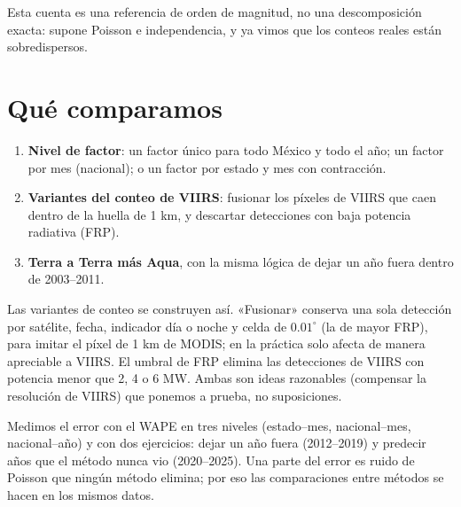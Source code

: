 Esta cuenta es una referencia de orden de magnitud, no una descomposición exacta: supone Poisson e independencia, y ya vimos que los conteos reales están sobredispersos.

\section{Qué comparamos}

\begin{enumerate}[label=\arabic*)]
  \item \textbf{Nivel de factor}: un factor único para todo México y todo el año; un factor por mes (nacional); o un factor por estado y mes con contracción.
  \item \textbf{Variantes del conteo de VIIRS}: fusionar los píxeles de VIIRS que caen dentro de la huella de 1 km, y descartar detecciones con baja potencia radiativa (FRP).
  \item \textbf{Terra a Terra más Aqua}, con la misma lógica de dejar un año fuera dentro de 2003--2011.
\end{enumerate}

Las variantes de conteo se construyen así. «Fusionar» conserva una sola detección por satélite, fecha, indicador día o noche y celda de $0.01^\circ$ (la de mayor FRP), para imitar el píxel de 1 km de MODIS; en la práctica solo afecta de manera apreciable a VIIRS. El umbral de FRP elimina las detecciones de VIIRS con potencia menor que 2, 4 o 6 MW. Ambas son ideas razonables (compensar la resolución de VIIRS) que ponemos a prueba, no suposiciones.

\begin{ideaclave}
Medimos el error con el WAPE en tres niveles (estado--mes, nacional--mes, nacional--año) y con dos ejercicios: dejar un año fuera (2012--2019) y predecir años que el método nunca vio (2020--2025). Una parte del error es ruido de Poisson que ningún método elimina; por eso las comparaciones entre métodos se hacen en los mismos datos.
\end{ideaclave}
